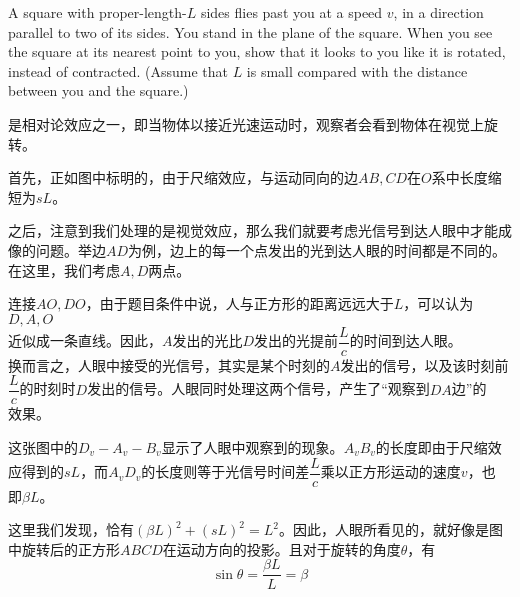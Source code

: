 \begin{solution}

    A square with proper-length-$L$ sides flies past you at a speed $v$, in a direction parallel to two of its sides. You stand in the plane of the square. When you see the square at its nearest point to you, show that it looks to you like it is rotated, instead of contracted. (Assume that $L$ is small compared with the distance between you and the square.)

    \tcbrule

     是相对论效应之一，即当物体以接近光速运动时，观察者会看到物体在视觉上旋转。


    首先，正如图中标明的，由于尺缩效应，与运动同向的边$AB,CD$在$O$系中长度缩短为$sL$。

    之后，注意到我们处理的是视觉效应，那么我们就要考虑光信号到达人眼中才能成像的问题。举边$AD$为例，边上的每一个点发出的光到达人眼的时间都是不同的。在这里，我们考虑$A,D$两点。

    连接$AO,DO$，由于题目条件中说，人与正方形的距离远远大于$L$，可以认为$D,A,O$\\[1ex]
    近似成一条直线。因此，$A$发出的光比$D$发出的光提前$\dfrac{L}{c}$的时间到达人眼。\\[1ex]
    换而言之，人眼中接受的光信号，其实是某个时刻的$A$发出的信号，以及该时刻前\\[1ex]
    $\dfrac{L}{c}$的时刻时$D$发出的信号。人眼同时处理这两个信号，产生了“观察到$DA$边”的\\[1ex]
    效果。


    这张图中的$D_v-A_v-B_v$显示了人眼中观察到的现象。$A_vB_v$的长度即由于尺缩效\\[1ex]
    应得到的$sL$，而$A_vD_v$的长度则等于光信号时间差$\dfrac{L}{c}$乘以正方形运动的速度$v$，也\\[1ex]
    即$\beta L$。

    这里我们发现，恰有$(\beta L)^2 + (sL)^2 = L^2$。因此，人眼所看见的，就好像是图中旋转后的正方形$ABCD$在运动方向的投影。且对于旋转的角度$\theta$，有
    \[\sin\theta=\dfrac{\beta L}{L}=\beta\]
\end{solution}
